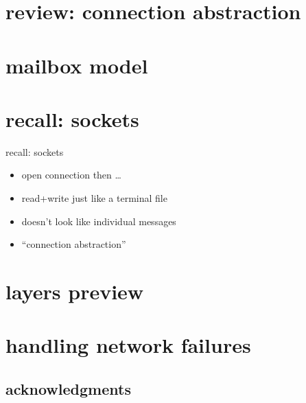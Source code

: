 \date{}
\title{}
\date{}

\begin{frame}
    \titlepage
\end{frame}



\section{review: connection abstraction}



\section{mailbox model}


\section{recall: sockets}

\begin{frame}{recall: sockets}
    \begin{itemize}
    \item open connection then \ldots \\
    \item read+write just like a terminal file
    \vspace{.5cm}
    \item doesn't look like individual messages
    \item ``connection abstraction''
    \end{itemize}
\end{frame}

\section{layers preview}


\section{handling network failures}



\subsection{acknowledgments}


